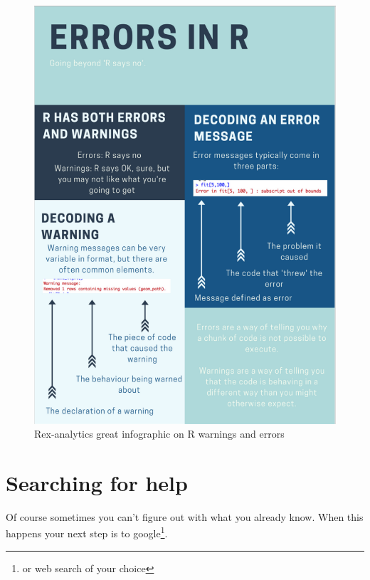 \documentclass[
]{book}
\begin{document}
\begin{figure}

{\centering \includegraphics[width=10.26in]{images/08_troubleshooting/errors-in-R-739x1024} 

}

\caption{Rex-analytics great infographic on R warnings and errors}\label{fig:unnamed-chunk-138}
\end{figure}

\hypertarget{searching-for-help}{%
\section{Searching for help}\label{searching-for-help}}

Of course sometimes you can't figure out with what you already know. When this happens your next step is to google\footnote{or web search of your choice}.
\end{document}
